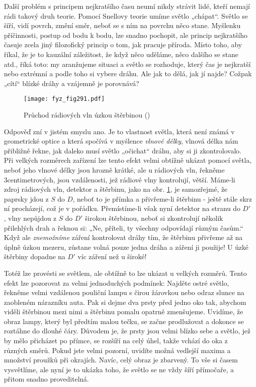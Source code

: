 {    Další problém s principem nejkratšího času neumí nikdy strávit lidé, kteří nemají rádi takový 
    druh teorie. Pomocí Snellovy teorie umíme světlo „chápat“. Světlo se šíří, vidí povrch, změní 
    směr, neboť se s ním na povrchu něco stane. Myšlenku příčinnosti, postup od bodu k bodu, lze 
    snadno pochopit, ale princip nejkratšího časuje zcela jiný filozofický princip o tom, jak 
    pracuje příroda. Místo toho, aby říkal, že je to kauzální záležitost, že když něco uděláme, 
    něco dalšího se stane atd., říká toto: my aranžujeme situaci a světlo se rozhoduje, který čas 
    je nejkratší nebo extrémní a podle toho si vybere dráhu. Ale jak to dělá, jak jí najde? Cožpak 
    „cítí“ blízké dráhy a vzájemně je porovnává?
    
    \begin{figure}[ht!] %
      \centering
      \texttt{[image: fyz\_fig291.pdf]}
      \caption{Průchod rádiových vln úzkou štěrbinou
               (\cite[s.~354]{Feynman01})}
      \label{fyz:fig291}
    \end{figure}
    
    Odpověď zní v jistém smyslu ano. Je to vlastnost světla, která není známá v geometrické optice 
    a která spočívá v myšlence \emph{vlnové délky}, vlnová délka nám přibližně řekne, jak daleko 
    musí světlo „očichat“ dráhu, aby si ji zkontrolovalo. Při velkých rozměrech zařízení lze tento 
    efekt velmi obtížně ukázat pomocí světla, neboť jeho vlnové délky jsou hrozně krátké, ale u 
    rádiových vln, řekněme 3centimetrových, jsou vzdálenosti, jež rádiové vlny kontrolují, větší. 
    Máme-li zdroj rádiových vln, detektor a štěrbinu, jako na obr. \ref{fyz:fig291}, je samozřejmé, 
    že paprsky jdou z \(S\) do \(D\), neboť to je přímka a přivřeme-li štěrbinu - ještě stále skrz 
    ní procházejí, což je v pořádku. Přemístíme-li však nyní detektor na stranu do \(D'\), vlny 
    nepůjdou z \(S\) do \(D'\) širokou štěrbinou, neboť si zkontrolují několik přilehlých drah a 
    řeknou si: „Ne, příteli, ty všechny odpovídají různým časům.“ Když ale \emph{znemožníme} záření 
    kontrolovat dráhy tím, že štěrbinu přivřeme až na úplně úzkou mezeru, zůstane volná pouze jedna 
    dráha a záření ji použije! U úzké štěrbiny dopadne na \(D'\) víc záření než u široké!
    
    Totéž lze provésti se světlem, ale obtížně to lze ukázat u velkých rozměrů. Tento efekt lze 
    pozorovat za velmi jednoduchých podmínek: Najděte ostré světlo, řekněme velmi vzdálenou 
    pouliční lampu s čirou žárovkou nebo odraz slunce na zaobleném nárazníku auta. Pak si dejme dva 
    prsty před jedno oko tak, abychom viděli štěrbinou mezi nimi a štěrbinu pomalu opatrně 
    zmenšujeme. Uvidíme, že obraz lampy, který byl předtím malou tečku, se začne prodlužovat a 
    dokonce se roztáhne do dlouhé čáry. Důvodem je, že prsty jsou velmi blízko sebe a světlo, jež 
    by mělo přicházet po přímce, se rozšíří na celý úhel, takže vchází do oka z různých směrů. 
    Pokud jste velmi pozorní, uvidíte možná vedlejší maxima a množství proužků při okrajích. Navíc, 
    celý obraz je zbarvený. To vše si časem vysvětlíme, ale nyní je to ukázka toho, že světlo se ne 
    vždy šíří přímočaře, a přitom snadno proveditelná.
    
}
